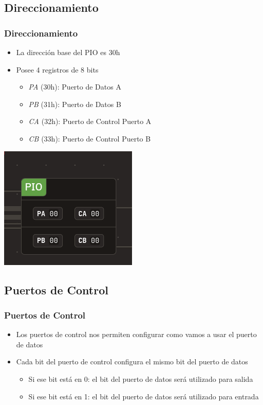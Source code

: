 \documentclass{beamer}
\begin{document}
\subsection{Direccionamiento}
\begin{frame}
\frametitle{Direccionamiento}
\begin{itemize}
 \item La dirección base del PIO es 30h
 \item Posee 4 registros de 8 bits
 \begin{itemize}
   \item \emph{PA} (30h): Puerto de Datos A
   \item \emph{PB} (31h): Puerto de Datos B
   \item \emph{CA} (32h): Puerto de Control Puerto A
   \item \emph{CB} (33h): Puerto de Control Puerto B
 \end{itemize}
 \end{itemize}
\begin{center}
 \includegraphics[scale=0.50]{pio_vonsim.png}
\end{center}
\end{frame}

\subsection{Puertos de Control}
\begin{frame}
\frametitle{Puertos de Control}
\begin{itemize}
 \item Los puertos de control nos permiten configurar como vamos a usar el puerto de datos
 \item Cada bit del puerto de control configura el mismo bit del puerto de datos
 \begin{itemize}
   \item Si ese bit está en 0: el bit del puerto de datos será utilizado para salida
   \item Si ese bit está en 1: el bit del puerto de datos será utilizado para entrada
 \end{itemize}
\end{itemize}

\end{frame}
\end{document}
